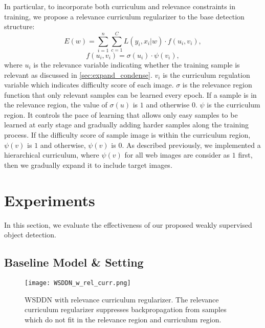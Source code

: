 \documentclass[10pt,twocolumn,letterpaper]{article}
\begin{document}
In particular, to incorporate both curriculum and relevance constraints in training, we propose a relevance curriculum regularizer to the base detection structure:
\begin{equation}\label{eq:energy_curr_rel_term}
E(w) = \sum_{i=1}^{n}\sum_{c=1}^{C}L(y_{i} , x_{i} | w) \cdot f(u_{i},v_{i}),
\end{equation}
\begin{equation}\label{eq:curr_rel_term}
f(u_{i},v_{i}) = \sigma (u_{i}) \cdot \psi (v_{i}),
\end{equation}
where \(u_{i}\) is the relevance variable indicating whether the training sample is relevant as discussed in \ref{sec:expand_condense}. \(v_{i}\) is the curriculum regulation variable which indicates difficulty score of each image. \(\sigma\) is the relevance region function that only relevant samples can be learned every epoch. If a sample is in the relevance region, the value of \(\sigma(u)\) is $1$ and otherwise $0$. \(\psi\) is the curriculum region. It controls the pace of learning that allows only easy samples to be learned at early stage and gradually adding harder samples along the training process. If the difficulty score of sample image is within the curriculum region, \(\psi(v)\) is $1$ and otherwise, \(\psi(v)\) is $0$. As described previously, we implemented a hierarchical curriculum, where \(\psi(v)\) for all web images are consider as $1$ first, then we gradually expand it to include target images.







\section {Experiments}
\label{exp}
In this section, we evaluate the effectiveness of our proposed weakly supervised object detection.

\subsection {Baseline Model \& Setting}
\begin{figure}[t]
\texttt{[image: WSDDN\_w\_rel\_curr.png]}
\caption{WSDDN with relevance curriculum regularizer. The relevance curriculum regularizer suppresses backpropagation from samples which do not fit in the relevance region and curriculum region. }
\label{fig:wsddn_w_curr_rel}
\end{figure}
\end{document}
